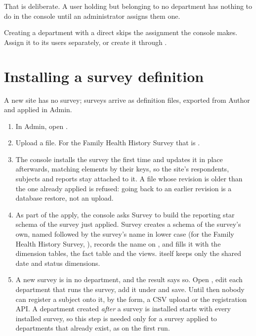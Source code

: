 \documentclass[11pt, a4paper]{article}
\begin{document}

\begin{elicitnote}
That is deliberate. A user holding  but belonging to no department has
nothing to do in the console until an administrator assigns them one.
\end{elicitnote}

\begin{elicitcaution}
Creating a department with a direct  skips the assignment the console makes.
Assign it to its users separately, or create it through .
\end{elicitcaution}

\section{Installing a survey definition}
\label{sec:definition}

A new site has no survey; surveys arrive as definition files, exported from Author and applied
in Admin.

\begin{enumerate}
  \item In Admin, open .
  \item Upload a  file. For the Family Health History Survey that is
        .
  \item The console installs the survey the first time and updates it in place afterwards,
        matching elements by their keys, so the site's respondents, subjects and reports stay
        attached to it. A file whose revision is older than the one already applied is refused:
        going back to an earlier revision is a database restore, not an upload.
  \item As part of the apply, the console asks Survey to build the reporting star schema
        of the survey just applied. Survey creates a schema of the survey's own, named
         followed by the survey's name in lower case (for the Family Health
        History Survey, ), records the name on
        , and fills it with the dimension tables, the fact
        table and the views.  itself keeps only the shared date and status
        dimensions.
  \item A new survey is in no department, and the result says so. Open , edit
        each department that runs the survey, add it under  and save. Until then
        nobody can register a subject onto it, by the form, a CSV upload or the registration
        API. A department created \emph{after} a survey is installed starts with every installed
        survey, so this step is needed only for a survey applied to departments that already
        exist, as on the first run.
\end{enumerate}
\end{document}
